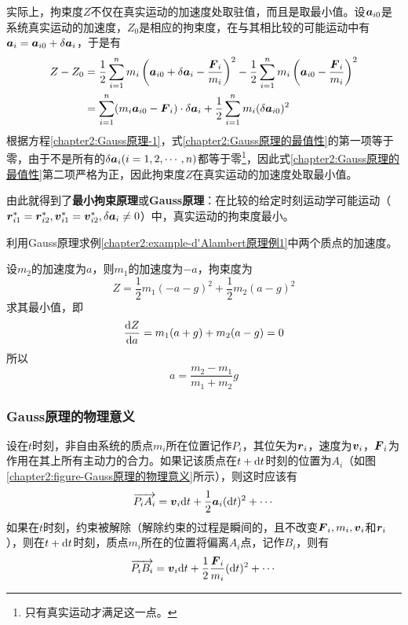 实际上，拘束度$Z$不仅在真实运动的加速度处取驻值，而且是取最小值。设$\boldsymbol{a}_{i0}$是系统真实运动的加速度，$Z_0$是相应的拘束度，在与其相比较的可能运动中有$\boldsymbol{a}_i=\boldsymbol{a}_{i0}+\delta\boldsymbol{a}_i$，于是有
\begin{align}
	Z-Z_0 & = \frac12\sum_{i=1}^nm_i\left(\boldsymbol{a}_{i0}+\delta\boldsymbol{a}_i-\frac{\boldsymbol{F}_i}{m_i}\right)^2 - \frac12\sum_{i=1}^nm_i\left(\boldsymbol{a}_{i0}-\frac{\boldsymbol{F}_i}{m_i}\right)^2 \nonumber \\
	& = \sum_{i=1}^n (m_i\boldsymbol{a}_{i0}-\boldsymbol{F}_i)\cdot \delta\boldsymbol{a}_i + \frac12 \sum_{i=1}^n m_i(\delta \boldsymbol{a}_{i0})^2
	\label{chapter2:Gauss原理的最值性}
\end{align}
根据方程\eqref{chapter2:Gauss原理-1}，式\eqref{chapter2:Gauss原理的最值性}的第一项等于零，由于不是所有的$\delta\boldsymbol{a}_i(i=1,2,\cdots,n)$都等于零\footnote{只有真实运动才满足这一点。}，因此式\eqref{chapter2:Gauss原理的最值性}第二项严格为正，因此拘束度$Z$在真实运动的加速度处取最小值。

由此就得到了{\bf 最小拘束原理}或{\bf Gauss原理}：在比较的给定时刻运动学可能运动（$\boldsymbol{r}_{i1}^*=\boldsymbol{r}_{i2}^*, \boldsymbol{v}_{i1}^*=\boldsymbol{v}_{i2}^*, \delta\boldsymbol{a}_i\neq 0$）中，真实运动的拘束度最小。

\begin{example}
利用Gauss原理求例\ref{chapter2:example-d'Alambert原理例1}中两个质点的加速度。
\end{example}
\begin{solution}
设$m_2$的加速度为$a$，则$m_1$的加速度为$-a$，拘束度为
\begin{equation*}
	Z = \frac12 m_1(-a-g)^2+\frac12 m_2(a-g)^2
\end{equation*}
求其最小值，即
\begin{equation*}
	\frac{\mathrm{d} Z}{\mathrm{d} a} = m_1(a+g)+m_2(a-g) = 0
\end{equation*}
所以
\begin{equation*}
	a = \frac{m_2-m_1}{m_1+m_2}g
\end{equation*}
\end{solution}

\subsubsection{Gauss原理的物理意义}

设在$t$时刻，非自由系统的质点$m_i$所在位置记作$P_i$，其位矢为$\boldsymbol{r}_i$，速度为$\boldsymbol{v}_i$，$\boldsymbol{F}_i$为作用在其上所有主动力的合力。如果记该质点在$t+\mathrm{d} t$时刻的位置为$A_i$（如图\ref{chapter2:figure-Gauss原理的物理意义}所示），则这时应该有
\begin{equation*}
	\overrightarrow{P_iA_i} = \boldsymbol{v}_i\mathrm{d} t + \frac12\boldsymbol{a}_i(\mathrm{d} t)^2 + \cdots
\end{equation*}
如果在$t$时刻，约束被解除（解除约束的过程是瞬间的，且不改变$\boldsymbol{F}_i,m_i,\boldsymbol{v}_i$和$\boldsymbol{r}_i$），则在$t+\mathrm{d} t$时刻，质点$m_i$所在的位置将偏离$A_i$点，记作$B_i$，则有
\begin{equation*}
	\overrightarrow{P_iB_i} = \boldsymbol{v}_i\mathrm{d} t + \frac12\frac{\boldsymbol{F}_i}{m_i}(\mathrm{d} t)^2 + \cdots
\end{equation*}

